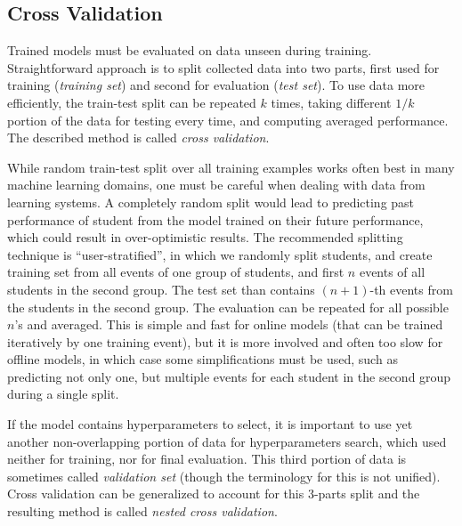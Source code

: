 \subsection{Cross Validation}

Trained models must be evaluated on data unseen during training.
Straightforward approach is to split collected data into two parts,
  first used for training (\emph{training set})
  and second for evaluation (\emph{test set}).
To use data more efficiently, the train-test split can be repeated
  $k$ times, taking different $1/k$ portion of the data for testing every time,
  and computing averaged performance.
The described method is called \emph{cross validation}.

While random train-test split over all training examples works often
  best in many machine learning domains,
  one must be careful when dealing with data from learning systems.
A completely random split would lead to predicting past performance
  of student from the model trained on their future performance,
  which could result in over-optimistic results.
The recommended splitting technique is ``user-stratified'',
  in which we randomly split students,
  and create training set from all events of one group of students,
  and first $n$ events of all students in the second group.
The test set than contains $(n+1)$-th events from the students
  in the second group.
The evaluation can be repeated for all possible $n$'s and averaged.
This is simple and fast for online models
  (that can be trained iteratively by one training event),
  but it is more involved and often too slow for offline models,
  in which case some simplifications must be used,
  such as predicting not only one, but multiple events
  for each student in the second group during a single split.


If the model contains hyperparameters to select,
  it is important to use yet another non-overlapping portion
  of data for hyperparameters search,
  which used neither for training, nor for final evaluation.
This third portion of data is sometimes called \emph{validation set}
  (though the terminology for this is not unified).
Cross validation can be generalized to account for this 3-parts split
  and the resulting method is called \emph{nested cross validation}.


